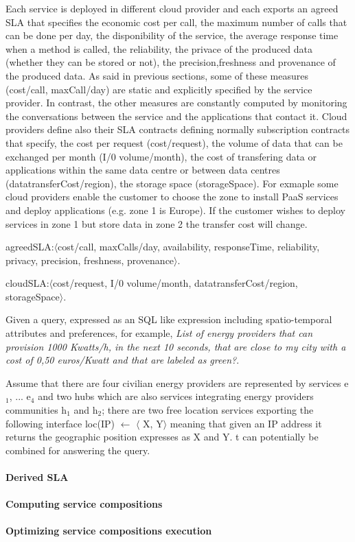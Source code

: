 Each service is deployed in different cloud provider and each exports an agreed SLA that specifies the economic cost per call, the maximum number of calls that can be done per day, the disponibility of the service, the average response time when a method is called, the reliability, the privace of the produced data (whether they can be stored or not), the precision,freshness and provenance of the produced data. As said in previous sections, some of these measures ({\sf cost/call, maxCall/day}) are static and explicitly specified by the service provider. In contrast, the other measures are constantly computed by monitoring the conversations between the service and the applications that contact it.  Cloud providers define also their SLA contracts defining normally subscription contracts that specify, the cost per request ({\sf cost/request}), the volume of data that can be exchanged per month ({\sf I/0 volume/month}), the cost of transfering data or applications within the same data centre or between data centres ({\sf datatransferCost/region}), the storage space ({\sf storageSpace}). For exmaple some cloud providers enable the customer to choose the zone to install PaaS services and deploy applications (e.g. zone 1 is Europe). If the customer wishes to deploy services in zone 1 but store data in zone 2 the transfer cost will change.

\begin{description}
\sf\footnotesize
 \item {\sf agreedSLA:$\langle$cost/call, maxCalls/day, availability, responseTime, reliability, privacy, precision, freshness, provenance$\rangle$}. 
 
 \item  {\sf cloudSLA:$\langle$cost/request, I/0 volume/month, datatransferCost/region, storageSpace$\rangle$}. 
 \end{description}
 

 Given a query, expressed as an SQL like expression including spatio-temporal attributes and preferences, for example, {\em List of energy providers that can provision 1000 Kwatts/h, in the next 10 seconds, that are close to my city with a cost of 0,50 euros/Kwatt and that are labeled as green?}. 
 
 
 Assume that there are four civilian energy providers are represented by services  {\sf e$_1$, ... e$_4$} and two {\sf hub}s which are also services integrating energy providers communities {\sf h$_1$ and h$_2$}; there are two free location services exporting  the following interface {\sf loc(IP) $\leftarrow$ $\langle$ X, Y$\rangle$} meaning that given an IP address it returns the geographic position expresses as {\sf X} and {\sf Y}. t can potentially be combined for answering the query. 
 
 \paragraph{Derived SLA}
 
  \paragraph{Computing service compositions}
  
   \paragraph{Optimizing service compositions execution}
 
